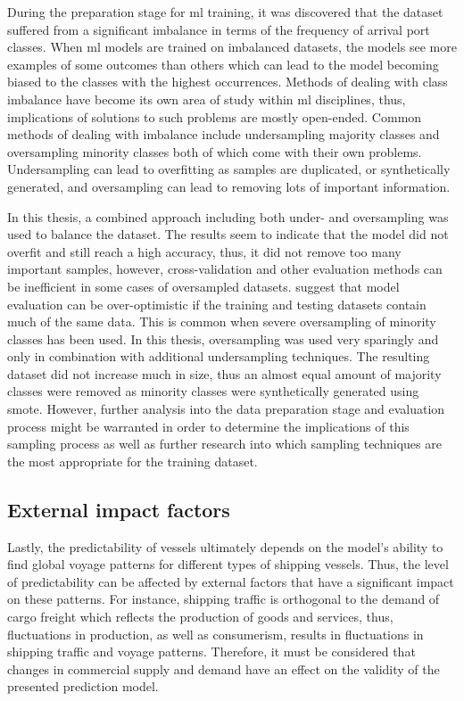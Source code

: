 During the preparation stage for \acrshort{ml} training, it was discovered that the dataset suffered from a significant imbalance in terms of the frequency of arrival port classes. When \acrshort{ml} models are trained on imbalanced datasets, the models see more examples of some outcomes than others which can lead to the model becoming biased to the classes with the highest occurrences. Methods of dealing with class imbalance have become its own area of study within \acrshort{ml} disciplines, thus, implications of solutions to such problems are mostly open-ended. Common methods of dealing with imbalance include undersampling majority classes and oversampling minority classes both of which come with their own problems. Undersampling can lead to overfitting as samples are duplicated, or synthetically generated, and oversampling can lead to removing lots of important information.

In this thesis, a combined approach including both under- and oversampling was used to balance the dataset. The results seem to indicate that the model did not overfit and still reach a high accuracy, thus, it did not remove too many important samples, however, cross-validation and other evaluation methods can be inefficient in some cases of oversampled datasets. \cite{cv_imbalance} suggest that model evaluation can be over-optimistic if the training and testing datasets contain much of the same data. This is common when severe oversampling of minority classes has been used. In this thesis, oversampling was used very sparingly and only in combination with additional undersampling techniques. The resulting dataset did not increase much in size, thus an almost equal amount of majority classes were removed as minority classes were synthetically generated using \acrfull{smote}. However, further analysis into the data preparation stage and evaluation process might be warranted in order to determine the implications of this sampling process as well as further research into which sampling techniques are the most appropriate for the training dataset.

\subsection{External impact factors}

Lastly, the predictability of vessels ultimately depends on the model's ability to find global voyage patterns for different types of shipping vessels. Thus, the level of predictability can be affected by external factors that have a significant impact on these patterns. For instance, shipping traffic is orthogonal to the demand of cargo freight which reflects the production of goods and services, thus, fluctuations in production, as well as consumerism, results in fluctuations in shipping traffic and voyage patterns. Therefore, it must be considered that changes in commercial supply and demand have an effect on the validity of the presented prediction model.


